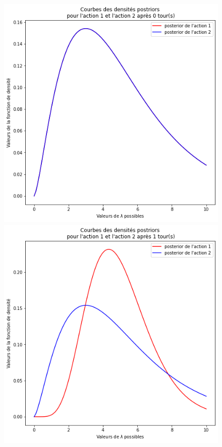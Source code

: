 \documentclass[letterpaper,11pt]{article}
\begin{document}
\begin{figure}[H]
\begin{center}
\includegraphics[scale=0.45]{posterior_tour0.png} \hfill \includegraphics[scale=0.45]{posterior_tour1.png}


\end{center}
\end{figure}
\end{document}
